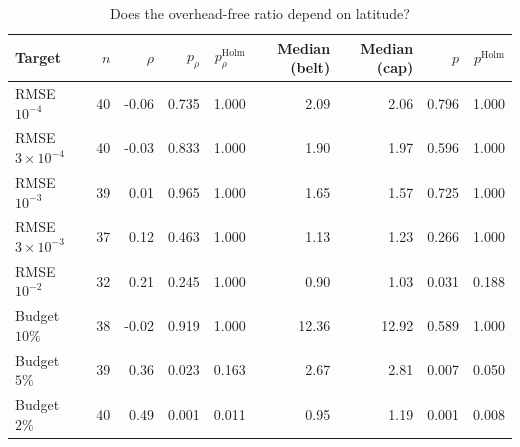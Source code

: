 \begin{table}[t]
\centering
\caption{Does the overhead-free ratio depend on latitude?}
\label{tab:latitude_effect}
\footnotesize
\begin{tabular}{lrrrrrrrr}
\toprule
Target & $n$ & $\rho$ & $p_\rho$ & $p_\rho^{\mathrm{Holm}}$ & Median (belt) & Median (cap) & $p$ & $p^{\mathrm{Holm}}$ \\
\midrule
RMSE $10^{-4}$ & 40 & -0.06 & 0.735 & 1.000 & 2.09 & 2.06 & 0.796 & 1.000 \\
RMSE $3\times10^{-4}$ & 40 & -0.03 & 0.833 & 1.000 & 1.90 & 1.97 & 0.596 & 1.000 \\
RMSE $10^{-3}$ & 39 & 0.01 & 0.965 & 1.000 & 1.65 & 1.57 & 0.725 & 1.000 \\
RMSE $3\times10^{-3}$ & 37 & 0.12 & 0.463 & 1.000 & 1.13 & 1.23 & 0.266 & 1.000 \\
RMSE $10^{-2}$ & 32 & 0.21 & 0.245 & 1.000 & 0.90 & 1.03 & 0.031 & 0.188 \\
Budget $10\%$ & 38 & -0.02 & 0.919 & 1.000 & 12.36 & 12.92 & 0.589 & 1.000 \\
Budget $5\%$ & 39 & 0.36 & 0.023 & 0.163 & 2.67 & 2.81 & 0.007 & 0.050 \\
Budget $2\%$ & 40 & 0.49 & 0.001 & 0.011 & 0.95 & 1.19 & 0.001 & 0.008 \\
\bottomrule
\end{tabular}
\end{table}
